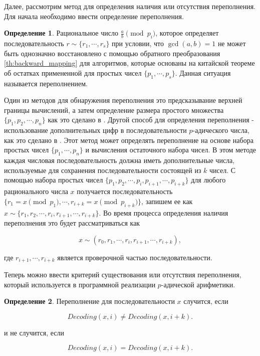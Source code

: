 \documentclass[master, och, diploma, times]{sty/SCWorks}
\theoremstyle{plain}
\theoremstyle{definition}
\newtheorem{defn}{Определение}[section]
\numberwithin{equation}{section}
\begin{document}
Далее, рассмотрим метод для определения наличия или отсутствия переполнения. Для начала необходимо ввести определение переполнения.

\begin{defn}
Рациональное число $\frac{a}{b} \pmod{p_i}$, которое определяет последовательность $r \sim \{r_1,\cdots, r_s\}$ при условии, что $\gcd{(a, b)}=1$ не может быть однозначно восстановлено с помощью обратного преобразования \ref{th:backward_mapping} для  алгоритмов, которые основаны на китайской теореме об остатках примененной для простых чисел $\{p_1,\cdots, p_s\}$. Данная ситуация называется переполнением.
\end{defn}

Один из методов для обнаружения переполнения это предсказывание верхней границы вычислений, а затем определение размера простого множества $\{p_1,p_2, \cdots, p_n\}$ как это сделано в \cite{bib:numbers:matula}. Другой способ для определения переполнения - использование дополнительных цифр в последовательности $p$-адического числа, как это сделано в \cite{bib:numbers:hensel:overflow}. Этот метод может определять переполнение на основе набора простых чисел $\{p_1,\cdots, p_n\}$ и вычисления остаточного набора чисел. В этом методе каждая числовая последовательность должна иметь дополнительные числа, используемые для сохранения последовательности состоящей из $k$ чисел.
С помощью набора простых чисел $\{p_1,p_2, \cdots, p_i, p_{i+1}, \cdots, p_{i+k}\}$ для любого рационального числа $x$ получается последовательность $\{r_1 = x \pmod{p_1},\cdots, r_{i+k}= x\pmod{p_{i+k}}\}$, запишем ее как $x \sim \{r_1, r_2, \cdots, r_{i}, r_{i+1}, \cdots, r_{i+k}\}$.
Во время процесса определения наличия переполнения это будет рассматриваться как

\begin{equation}
x \sim (r_0, r_1, \cdots, r_i, r_{i+1}, \cdots, r_{i+k}),
\end{equation}

\noindent где $ r_{i+1}, \cdots, r_{i+k}$ является проверочной частью последовательности.

Теперь можно ввести критерий существования или отсутствия переполнения, который используется в программной реализации $p$-адической арифметики.

\begin{defn}
Переполнение для последовательности $x$ случится, если 	

\begin{equation}
Decoding(x,i) \neq Decoding(x,i+k).
\end{equation}

\noindent и не случится, если

\begin{equation}
Decoding(x,i) = Decoding(x,i+k). 
\end{equation}
\end{defn}
\end{document}

